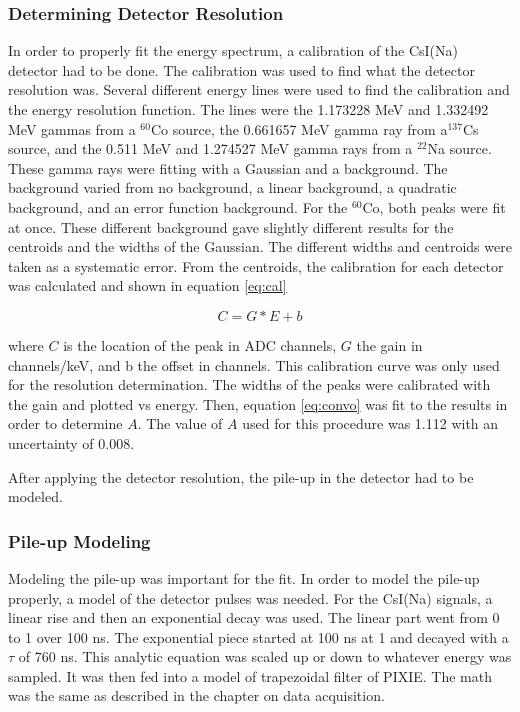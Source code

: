 \documentclass[main.tex]{subfiles}
\begin{document}
\subsubsection{Determining Detector Resolution}
In order to properly fit the energy spectrum, a calibration of the CsI(Na) detector had to be done.
The calibration was used to find what the detector resolution was.
Several different energy lines were used to find the calibration and the energy resolution function.
The lines were the 1.173228 MeV and 1.332492 MeV gammas from a $^{60}$Co source, the 0.661657 MeV gamma ray from a$^{137}$Cs source, and the 0.511 MeV and 1.274527 MeV gamma rays from a $^{22}$Na source.
These gamma rays were fitting with a Gaussian and a background.
The background varied from no background, a linear background, a quadratic background, and an error function background.
For the $^{60}$Co, both peaks were fit at once.
These different background gave slightly different results for the centroids and the widths of the Gaussian.
The different widths and centroids were taken as a systematic error.
From the centroids, the calibration for each detector was calculated and shown in equation \ref{eq:cal}

\begin{equation}
	C = G * E + b
	\label{eq:cal}
\end{equation}

where $C$ is the location of the peak in ADC channels, $G$ the gain in channels/keV, and b the offset in channels.
This calibration curve was only used for the resolution determination.
The widths of the peaks were calibrated with the gain and plotted vs energy.
Then, equation \ref{eq:convo} was fit to the results in order to determine $A$.
The value of $A$ used for this procedure was 1.112 with an uncertainty of 0.008.

After applying the detector resolution, the pile-up in the detector had to be modeled.

\subsubsection{Pile-up Modeling}
Modeling the pile-up was important for the fit. 
In order to model the pile-up properly, a model of the detector pulses was needed. 
For the CsI(Na) signals, a linear rise and then an exponential decay was used.
The linear part went from 0 to 1 over 100 ns. 
The exponential piece started at 100 ns at 1 and decayed with a $\tau$ of 760 ns.
This analytic equation was scaled up or down to whatever energy was sampled.
It was then fed into a model of trapezoidal filter of PIXIE. 
The math was the same as described in the chapter on data acquisition.
\end{document}
